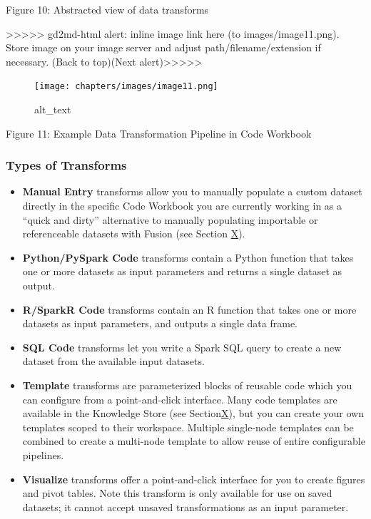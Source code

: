 \documentclass[
  letterpaper,
  DIV=11,
  numbers=noendperiod]{scrreprt}
\providecommand{\tightlist}{%
  \setlength{\itemsep}{0pt}\setlength{\parskip}{0pt}}\usepackage{longtable,booktabs,array}
\begin{document}
Figure 10: Abstracted view of data transforms

{\textgreater\textgreater\textgreater\textgreater\textgreater{}
gd2md-html alert: inline image link here (to images/image11.png). Store
image on your image server and adjust path/filename/extension if
necessary. }(Back to top)(Next
alert){\textgreater\textgreater\textgreater\textgreater\textgreater{} }

\begin{figure}

{\centering \texttt{[image: chapters/images/image11.png]}

}

\caption{alt\_text}

\end{figure}

Figure 11: Example Data Transformation Pipeline in Code Workbook

\hypertarget{types-of-transforms}{%
\subsubsection{Types of Transforms}\label{types-of-transforms}}

\begin{itemize}
\tightlist
\item
  \textbf{Manual Entry} transforms allow you to manually populate a
  custom dataset directly in the specific Code Workbook you are
  currently working in as a ``quick and dirty'' alternative to manually
  populating importable or referenceable datasets with Fusion (see
  Section \protect\hyperlink{Fusion}{X}).
\item
  \textbf{Python/PySpark Code} transforms contain a Python function that
  takes one or more datasets as input parameters and returns a single
  dataset as output.
\item
  \textbf{R/SparkR Code} transforms contain an R function that takes one
  or more datasets as input parameters, and outputs a single data frame.
\item
  \textbf{SQL Code} transforms let you write a Spark SQL query to create
  a new dataset from the available input datasets.
\item
  \textbf{Template }transforms are parameterized blocks of reusable code
  which you can configure from a point-and-click interface. Many code
  templates are available in the Knowledge Store (see
  Section\protect\hyperlink{N3C-Knowledge-Store}{X}), but you can create
  your own templates scoped to their workspace. Multiple single-node
  templates can be combined to create a multi-node template to allow
  reuse of entire configurable pipelines.
\item
  \textbf{Visualize }transforms offer a point-and-click interface for
  you to create figures and pivot tables. Note this transform is only
  available for use on saved datasets; it cannot accept unsaved
  transformations as an input parameter.
\end{itemize}
\end{document}
